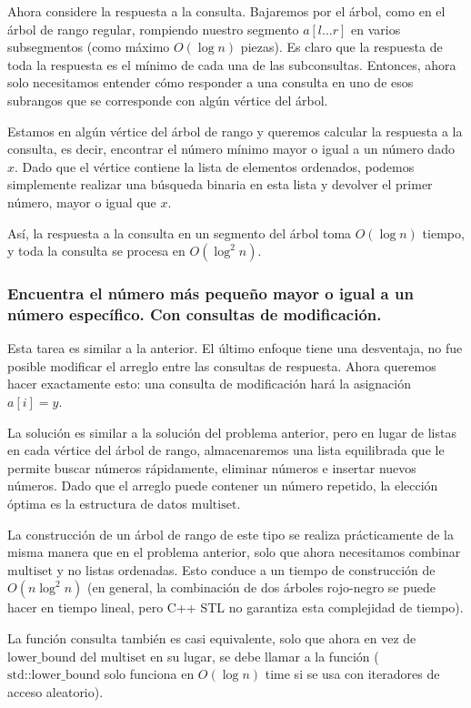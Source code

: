 Ahora considere la respuesta a la consulta. Bajaremos por el árbol, como en el árbol de rango regular, rompiendo nuestro segmento $a[l \dots r]$ en varios subsegmentos (como máximo $O(\log n)$ piezas). Es claro que la respuesta de toda la respuesta es el mínimo de cada una de las subconsultas. Entonces, ahora solo necesitamos entender cómo responder a una consulta en uno de esos subrangos que se corresponde con algún vértice del árbol.

Estamos en algún vértice del árbol de rango y queremos calcular la respuesta a la consulta, es decir, encontrar el número mínimo mayor o igual a un número dado $x$. Dado que el vértice contiene la lista de elementos ordenados, podemos simplemente realizar una búsqueda binaria en esta lista y devolver el primer número, mayor o igual que $x$.

Así, la respuesta a la consulta en un segmento del árbol toma $O(\log n)$ tiempo, y toda la consulta se procesa en $O(\log^2n)$.

\subsubsection{Encuentra el número más pequeño mayor o igual a un número específico. Con consultas de modificación.}

Esta tarea es similar a la anterior. El último enfoque tiene una desventaja, no fue posible modificar el arreglo entre las consultas de respuesta. Ahora queremos hacer exactamente esto: una consulta de modificación hará la asignación $a[i] = y$.

La solución es similar a la solución del problema anterior, pero en lugar de listas en cada vértice del 
árbol de rango, almacenaremos una lista equilibrada que le permite buscar números rápidamente, eliminar 
números e insertar nuevos números. Dado que el arreglo puede contener un número repetido, la elección 
óptima es la estructura de datos $\text{multiset}$.

La construcción de un árbol de rango de este tipo se realiza prácticamente de la misma manera que en el 
problema anterior, solo que ahora necesitamos combinar $\text{multiset}$ y no listas ordenadas. Esto 
conduce a un tiempo de construcción de $O(n \log^2 n)$ (en general, la combinación de dos árboles 
rojo-negro se puede hacer en tiempo lineal, pero C++ STL no garantiza esta complejidad de tiempo).

La función $\text{consulta}$ también es casi equivalente, solo que ahora en vez de 
$\text{lower\_bound}$ del $\text{multiset}$ en su lugar, se debe llamar a la función ( $\text{std::lower\_bound}$ solo funciona en $O(\log n)$ time si se usa con iteradores de acceso 
aleatorio).

